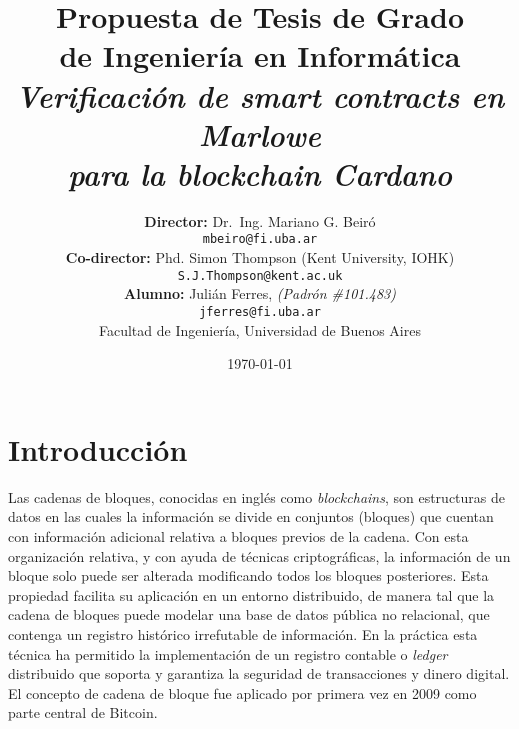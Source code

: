 \documentclass[12pt]{book}
\begin{document}
\begin{titlepage}

\title{     \textbf{Propuesta de Tesis de Grado \\ de Ingeniería en Informática}\\[2.5ex]
\textit{Verificación de smart contracts en Marlowe\\ para la blockchain Cardano}}

\author{
             \textbf{Director:} Dr.\ Ing. Mariano G. Beiró \\
         \texttt{mbeiro@fi.uba.ar}\\[2.5ex]
             \textbf{Co-director:} Phd. Simon Thompson (Kent University, IOHK) \\
         \texttt{S.J.Thompson@kent.ac.uk}
             \\[2.5ex]
             \textbf{Alumno:} Julián Ferres, \textit{(Padrón \#101.483)}                                \\
                    \texttt{ jferres@fi.uba.ar }                                    \\[2.5ex]
            \normalsize{Facultad de Ingeniería, Universidad de Buenos Aires}        \\
       }
\date{\today}

\end{titlepage}

\maketitle
\thispagestyle{empty}

\maketitle

{
  \hypersetup{linkcolor=black}
  \tableofcontents
}


\section{Introducción}
Las cadenas de bloques, conocidas en inglés como \textit{blockchains}, son estructuras de datos en las cuales la información se divide en conjuntos (bloques) que cuentan con información adicional relativa a bloques previos de la cadena. Con esta organización relativa, y con ayuda de técnicas criptográficas, la información de un bloque solo puede ser alterada modificando todos los bloques posteriores. Esta propiedad facilita su aplicación en un entorno distribuido, de manera tal que la cadena de bloques puede modelar una base de datos pública no relacional, que contenga un registro histórico irrefutable de información.
En la práctica esta técnica ha permitido la implementación de un registro contable o \textit{ledger} distribuido que soporta y garantiza la seguridad de transacciones y dinero digital. El concepto de cadena de bloque fue aplicado por primera vez en 2009 como parte central de Bitcoin.
\end{document}
